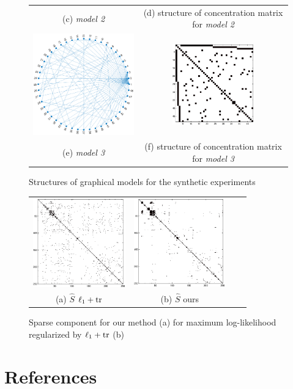\documentclass{article}
\begin{document}
\begin{figure}
\begin{tabular}{cc}
   \\    (c) \textit{model 2} & (d)  structure of concentration matrix for \textit{model 2} \\
      \includegraphics[width=6cm]{fig/diff_graph} 
  &   \includegraphics[width=3.5cm]{fig/diff_true}
   \\    (e) \textit{model 3} & (f)  structure of concentration matrix for \textit{model 3}
\end{tabular}
\caption{ Structures of graphical models for the synthetic experiments}
\end{figure}

\begin{figure}
\center
\begin{tabular}{cccc}
      \includegraphics[width=4cm]{fig/MILE_Som}
  &   \includegraphics[height=3.8cm]{fig/MILE_Ssl_ordered}
   \\   (a)  $\hat{S}$ $\ell_1+{\rm tr}$  & (b) $\hat{S}$ ours 
\end{tabular}
\caption{Sparse component for our method (a) for maximum log-likelihood regularized by $\ell_1+{\rm tr}$ (b) }
\end{figure}


\section*{References}


\end{document}
